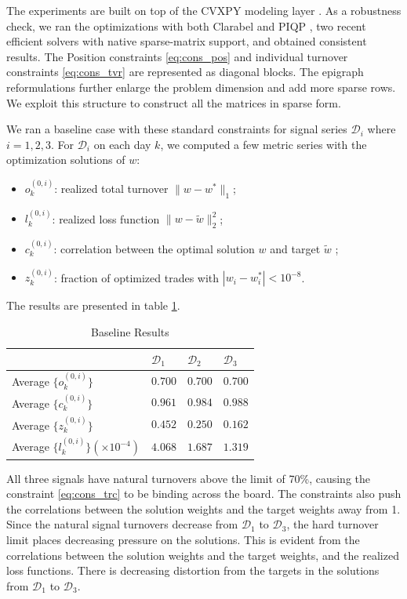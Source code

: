 \documentclass[11pt, letterpaper]{article}
\begin{document}
The experiments are built on top of the CVXPY modeling layer \cite{cvxpy}. As a robustness check, we ran the optimizations with
both Clarabel \cite{Clarabel_2024} and PIQP \cite{schwan2023piqp}, two recent efficient solvers with native sparse-matrix
support, and obtained consistent results. The Position constraints \eqref{eq:cons_pos} and individual turnover constraints
\eqref{eq:cons_tvr} are represented as diagonal blocks. The epigraph reformulations further enlarge the problem dimension and
add more sparse rows. We exploit this structure to construct all the matrices in sparse form.

We ran a baseline case with these standard constraints for signal series $\mathcal{D}_i$ where $i=1,2,3$. For $\mathcal{D}_i$ on
each day $k$, we computed a few metric series with the optimization solutions of $w$:
\begin{itemize}
\item $o_k^{(0,i)}$: realized total turnover $\lVert w - w^*\rVert_1$;
\item $l_k^{(0,i)}$: realized loss function $\lVert w - \tilde{w}\rVert_2^2$;
\item $c_k^{(0,i)}$: correlation between the optimal solution $w$ and target $\tilde{w}$ ;
\item $z_k^{(0,i)}$: fraction of optimized trades with $|w_i - w_i^*| < 10^{-8}$.
\end{itemize}

The results are presented in table \ref{tab:portfolio_metrics}.
\begin{table}
\centering
\caption{Baseline Results}
\label{tab:portfolio_metrics}
\begin{tabular}{llll}
  \toprule
  & $\mathcal{D}_1$ & $\mathcal{D}_2$ & $\mathcal{D}_3$ \\
  \midrule
  Average $\{o_k^{(0,i)}\}$ & $0.700$ & $0.700$ & $0.700$\\
  Average $\{c_k^{(0,i)}\}$ & $0.961$ & $0.984$ & $0.988$\\
  Average $\{z_k^{(0,i)}\}$ & $0.452$ & $0.250$ & $0.162$ \\
  Average $\{l_k^{(0,i)}\}  (\times 10 ^ {-4} )$ & $4.068$ & $1.687$ & $1.319$\\
\bottomrule
\end{tabular}
\end{table}
All three signals have natural turnovers above the limit of 70\%, causing the constraint \eqref{eq:cons_trc} to be binding
across the board. The constraints also push the correlations between the solution weights and the target weights away from 1.
Since the natural signal turnovers decrease from $\mathcal{D}_1$ to $\mathcal{D}_3$, the hard turnover limit places decreasing
pressure on the solutions. This is evident from the correlations between the solution weights and the target weights, and the
realized loss functions. There is decreasing distortion from the targets in the solutions from $\mathcal{D}_1$ to
$\mathcal{D}_3$.
\end{document}
